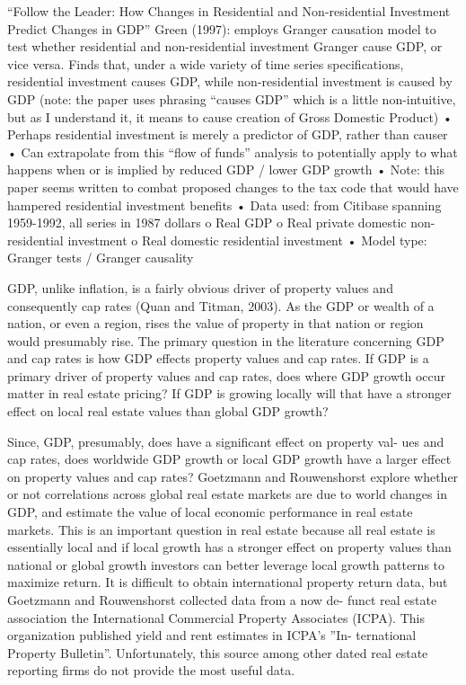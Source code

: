 “Follow the Leader: How Changes in Residential and Non-residential Investment Predict Changes in GDP”
Green (1997): employs Granger causation model to test whether residential and non-residential investment Granger cause GDP, or vice versa. Finds that, under a wide variety of time series specifications, residential investment causes GDP, while non-residential investment is caused by GDP (note: the paper uses phrasing “causes GDP” which is a little non-intuitive, but as I understand it, it means to cause creation of Gross Domestic Product)
•	Perhaps residential investment is merely a predictor of GDP, rather than causer
•	Can extrapolate from this “flow of funds” analysis to potentially apply to what happens when or is implied by reduced GDP / lower GDP growth
•	Note: this paper seems written to combat proposed changes to the tax code that would have hampered residential investment benefits
•	Data used: from Citibase spanning 1959-1992, all series in 1987 dollars
o	Real GDP
o	Real private domestic non-residential investment
o	Real domestic residential investment
•	Model type: Granger tests / Granger causality


GDP, unlike inflation, is a fairly obvious driver of property values and consequently cap rates (Quan and Titman, 2003). As the GDP or wealth of a nation, or even a region, rises the value of property in that nation or region would presumably rise. The primary question in the literature concerning GDP and cap rates is how GDP effects property values and cap rates. If GDP is a primary driver of property values and cap rates, does where GDP growth occur matter in real estate pricing? If GDP is growing locally will that have a stronger effect on local real estate values than global GDP growth?

Since, GDP, presumably, does have a significant effect on property val- ues and cap rates, does worldwide GDP growth or local GDP growth have a larger effect on property values and cap rates? Goetzmann and Rouwenshorst explore whether or not correlations across global real estate markets are due to world changes in GDP, and estimate the value of local economic performance in real estate markets. This is an important question in real estate because all real estate is essentially local and if local growth has a stronger effect on property values than national or global growth investors can better leverage local growth patterns to maximize return. It is difficult to obtain international property return data, but Goetzmann and Rouwenshorst collected data from a now de- funct real estate association the International Commercial Property Associates (ICPA). This organization published yield and rent estimates in ICPA’s ”In- ternational Property Bulletin”. Unfortunately, this source among other dated real estate reporting firms do not provide the most useful data. 

